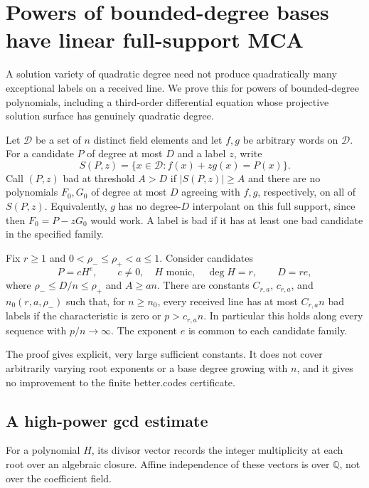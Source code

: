 \section{Powers of bounded-degree bases have linear full-support MCA}
\label{app:power-family-mca}

A solution variety of quadratic degree need not produce quadratically
many exceptional labels on a received line. We prove this for powers of
bounded-degree polynomials, including a third-order differential equation
whose projective solution surface has genuinely quadratic degree.

Let $\mathcal D$ be a set of $n$ distinct field elements and let $f,g$ be
arbitrary words on $\mathcal D$. For a candidate $P$ of degree at most
$D$ and a label $z$, write
\[
 S(P,z)=\{x\in\mathcal D:f(x)+zg(x)=P(x)\}.
\]
Call $(P,z)$ bad at threshold $A>D$ if $|S(P,z)|\ge A$ and there are
no polynomials $F_0,G_0$ of degree at most $D$ agreeing with $f,g$,
respectively, on all of $S(P,z)$. Equivalently, $g$ has no degree-$D$
interpolant on this full support, since then $F_0=P-zG_0$ would work.
A label is bad if it has at least one bad candidate in the specified family.

\begin{theorem}
\label{thm:power-family-linear-mca}
Fix $r\ge1$ and $0<\rho_-\le\rho_+<a\le1$. Consider candidates
\[
 P=cH^e,\qquad c\ne0,\quad H\text{ monic},\quad\deg H=r,
 \qquad D=re,
\]
where $\rho_-\le D/n\le\rho_+$ and $A\ge an$.
There are constants $C_{r,a}$, $c_{r,a}$, and
$n_0(r,a,\rho_-)$ such that, for $n\ge n_0$, every received line has
at most $C_{r,a}n$ bad labels if the characteristic is zero or
$p>c_{r,a}n$. In particular this holds along every sequence with
$p/n\to\infty$. The exponent $e$ is common to each candidate family.
\end{theorem}

The proof gives explicit, very large sufficient constants. It does not
cover arbitrarily varying root exponents or a base degree growing with
$n$, and it gives no improvement to the finite better.codes certificate.

\subsection{A high-power gcd estimate}

For a polynomial $H$, its divisor vector records the integer multiplicity
at each root over an algebraic closure. Affine independence of these
vectors is over $\mathbb Q$, not over the coefficient field.

